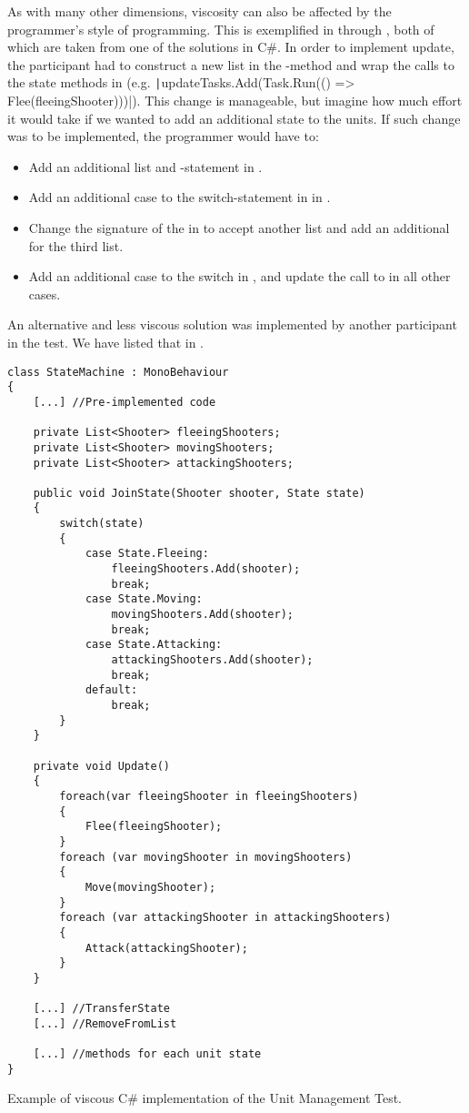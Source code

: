 As with many other dimensions, viscosity can also be affected by the programmer's style of programming. This is exemplified in  through , both of which are taken from one of the solutions in C\#. In order to implement  update, the participant had to construct a new list in the -method and wrap the calls to the state methods in  (e.g. \texttt|updateTasks.Add(Task.Run(() => Flee(fleeingShooter)))|). This change is manageable, but imagine how much effort it would take if we wanted to add an additional state to the units. If such change was to be implemented, the programmer would have to:
\begin{itemize}
    \item Add an additional list and -statement in .
    \item Add an additional case to the switch-statement in  in .
    \item Change the signature of the  in  to accept another list and add an additional  for the third list.
    \item Add an additional case to the switch in , and update the call to  in all other cases.
\end{itemize}
An alternative and less viscous solution was implemented by another participant in the test. We have listed that in .

\begin{listing}[H]
    \begin{verbatim}
class StateMachine : MonoBehaviour
{
    [...] //Pre-implemented code

    private List<Shooter> fleeingShooters;
    private List<Shooter> movingShooters;
    private List<Shooter> attackingShooters;

    public void JoinState(Shooter shooter, State state)
    {
        switch(state)
        {
            case State.Fleeing:
                fleeingShooters.Add(shooter);
                break;
            case State.Moving:
                movingShooters.Add(shooter);
                break;
            case State.Attacking:
                attackingShooters.Add(shooter);
                break;
            default:
                break;
        }
    }

    private void Update()
    {
        foreach(var fleeingShooter in fleeingShooters)
        {
            Flee(fleeingShooter);
        }
        foreach (var movingShooter in movingShooters)
        {
            Move(movingShooter);
        }
        foreach (var attackingShooter in attackingShooters)
        {
            Attack(attackingShooter);
        }
    }

    [...] //TransferState
    [...] //RemoveFromList

    [...] //methods for each unit state
}
    \end{verbatim}
    \caption{Example of viscous C\# implementation of the Unit Management Test.}
    \label{lst:csharp:viscous}
\end{listing}

